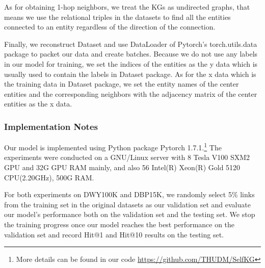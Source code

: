As for obtaining 1-hop neighbors, we treat the KGs as undirected graphs, that means we use the relational triples in the datasets to find all the entities connected to an entity regardless of the direction of the connection.

Finally, we reconstruct Dataset and use DataLoader of Pytorch's torch.utils.data package to packet our data and create batches. Because we do not use any labels in our model for training, we set the indices of the entities as the y data which is usually used to contain the labels in Dataset package. As for the x data which is the training data in Dataset package, we set the entity names of the center entities and the corresponding neighbors with the adjacency matrix of the center entities as the x data.


\subsubsection{Implementation Notes}

Our model is implemented using Python package Pytorch 1.7.1.\footnote{More details can be found in our code \url{https://github.com/THUDM/SelfKG}}
The experiments were conducted on a GNU/Linux server with 8 Tesla V100 SXM2 GPU and 32G GPU RAM mainly, and also 56 Intel(R) Xeon(R) Gold 5120 CPU(2.20GHz), 500G RAM.







For both experiments on DWY100K and DBP15K, we randomly select 5\% links from the training set in the original datasets as our validation set and evaluate our model's performance both on the validation set and the testing set. We stop the training progress once our model reaches the best performance on the validation set and record Hit@1 and Hit@10 results on the testing set.





